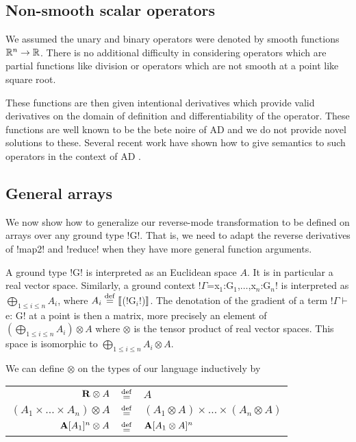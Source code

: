 \subsection{Non-smooth scalar operators} %
\label{sub:lift_non_smooth}

We assumed the unary and binary operators were denoted by smooth functions $\mathbb{R}^n\to\mathbb{R}$. 
There is no additional difficulty in considering operators which are partial functions 
like division or operators which are not smooth at a point like square root.

These functions are then given intentional derivatives which provide valid derivatives 
on the domain of definition and differentiability of the operator. 
These functions are well known to be the bete noire of AD \cite{griewank2008evaluating} 
and we do not provide novel solutions to these.  
Several recent work have shown how to give semantics to such operators in the context of AD \cite{vakar2020denotational,mazza2021automatic,sherman2021,lee2020correctness}.

\subsection{General arrays} %
\label{sub:lift_gen_arr}

We now show how to generalize our reverse-mode transformation to be defined on arrays over any ground type !G!.
That is, we need to adapt the reverse derivatives of !map2! and !reduce! when they have more general function arguments.

A ground type !G! is interpreted as an Euclidean space $A$. 
It is in particular a real vector space.
Similarly, a ground context !$\Gamma$=x$_1$:G$_1$,$\ldots$,x$_n$:G$_n$! is interpreted as $\bigoplus_{1\leq i\leq n}A_i$, where $A_i\stackrel {\mathrm{def}}=\llbracket$(!G$_i$!)$\rrbracket$.
The denotation of the gradient of a term !$\Gamma \vdash$ e: G! at a point is then a matrix, more precisely an element of $(\bigoplus_{1\leq i\leq n}A_i)\otimes A$
where $\otimes$ is the tensor product of real vector spaces. This space is isomorphic to $\bigoplus_{1\leq i\leq n}A_i\otimes A$.

We can define $\otimes$ on the types of our language inductively by

\begin{tabular}{r c l}
    $\mathbf{R} \otimes A$ & $\stackrel {\mathrm{def}}=$ & $A$ \\
    $(A_1 \times \ldots \times A_n)\otimes A$ & $\stackrel {\mathrm{def}}=$ & $(A_1\otimes A) \times \ldots \times (A_n \otimes A)$ \\
    $\mathbf{A}[A_1]^{n} \otimes A$ & $\stackrel {\mathrm{def}}=$ & $\mathbf{A}[A_1\otimes A]^{n}$
\end{tabular}

